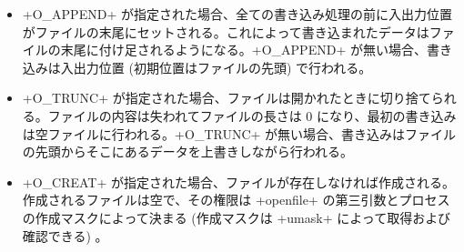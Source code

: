 \begin{itemize}
\item \ml+O_APPEND+ が指定された場合、全ての書き込み処理の前に入出力位置がファイルの末尾にセットされる。これによって書き込まれたデータはファイルの末尾に付け足されるようになる。\ml+O_APPEND+ が無い場合、書き込みは入出力位置 (初期位置はファイルの先頭) で行われる。

\item \ml+O_TRUNC+ が指定された場合、ファイルは開かれたときに切り捨てられる。ファイルの内容は失われてファイルの長さは 0 になり、最初の書き込みは空ファイルに行われる。\ml+O_TRUNC+ が無い場合、書き込みはファイルの先頭からそこにあるデータを上書きしながら行われる。

\item \ml+O_CREAT+ が指定された場合、ファイルが存在しなければ作成される。作成されるファイルは空で、その権限は \ml+openfile+ の第三引数とプロセスの作成マスクによって決まる (作成マスクは \ml+umask+ によって取得および確認できる) 。


\end{itemize}
